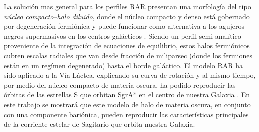 \documentclass[baaa]{baaa}
\begin{document}

La solución mas general para los perfiles RAR presentan una morfología del tipo \textit{núcleo compacto}--\textit{halo diluido}, donde el núcleo compacto y denso está gobernado por degeneración fermiónica y puede funcionar como alternativa a los agujeros negros supermasivos en los centros galácticos \citep{Arguelles2018,Arguelles2019}. Siendo un perfil semi-analítico proveniente de la integración de ecuaciones de equilibrio, estos halos fermiónicos cubren escalas radiales que van desde fracción de miliparsec (donde los fermiones están en un regímen degenerado) hasta el borde galáctico. El modelo RAR  ha sido aplicado a la Vía Láctea, explicando su curva de rotación \citep{Arguelles2018, Arguelles2023} y al mismo tiempo, por medio del núcleo compacto de materia oscura, ha podido reproducir las órbitas de las estrellas S que orbitan SgrA* en el centro de nuestra Galaxia \citep{BecerraVergara2021}. En este trabajo se mostrará que este modelo de halo de materia oscura, en conjunto con una componente bariónica, pueden reproducir las características principales de la corriente estelar de Sagitario que orbita nuestra Galaxia.
\end{document}
